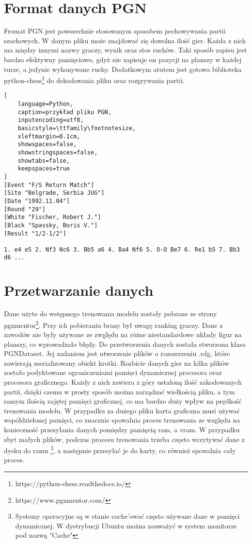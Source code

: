 \section*{Format danych PGN}
Fromat PGN jest powszechnie stosowanym sposobem pechowywania partii szachowych. W danym pliku może znajdować się dowolna ilość gier. Każda z nich ma między innymi nazwy graczy, wynik oraz stos ruchów. Taki sposób zapisu jest bardzo efektywny pamięciowo, gdyż nie zapisuje on pozycji na planszy w każdej turze, a jedynie wykonywane ruchy. Dodatkowym atutem jest gotowa biblioteka python-chess\footnote{https://python-chess.readthedocs.io/} do dekodowania pliku oraz rozgrywania partii.

\vspace{0.5cm}

\begin{lstlisting}[
    language=Python, 
    caption=przykład pliku PGN,
    inputencoding=utf8,
    basicstyle=\ttfamily\footnotesize,
    xleftmargin=0.1cm,
    showspaces=false,
    showstringspaces=false,
    showtabs=false,
    keepspaces=true
]
[Event "F/S Return Match"] 
[Site "Belgrade, Serbia JUG"] 
[Date "1992.11.04"] 
[Round "29"] 
[White "Fischer, Robert J."]
[Black "Spassky, Boris V."] 
[Result "1/2-1/2"] 

1. e4 e5 2. Nf3 Nc6 3. Bb5 a6 4. Ba4 Nf6 5. O-O Be7 6. Re1 b5 7. Bb3 d6 ...
\end{lstlisting}
\section*{Przetwarzanie danych}
Dane użyte do wstępnego trenowania modelu zostały pobrane ze strony pgnmentor\footnote{https://www.pgnmentor.com/}. Przy ich pobieraniu brany był uwagę ranking graczy. Dane z zawodów nie były używane ze zwględu na różne niestandardowe układy figur na planszy, co wprowadzało błędy. Do przetworzenia danych została stworzona klasa PGNDataset. Jej zadaniem jest utworzenie plików o rozszerzeniu .rdg, które zawierają zserializowany obiekt krotki. Rozbicie danych gier na kilka plików zostało podyktowane ograniczeniami pamięci dynamicznej procesora oraz procesora graficznego. Każdy z nich zawiera z góry ustaloną ilość zakodowanych partii, dzięki czemu w prosty sposób można zarządzać wielkością pliku, a tym samym ilością zajętej pamięci graficznej, co ma bardzo duży wpływ na prędkość trenowania modelu. W przypadku za dużego pliku karta graficzna musi używać współdzielonej pamięci, co znacznie spowalnia proces trenowania ze względu na konieczność przesyłania danych pomiędzy pamięcią ram, a vram. W przypadku zbyt małych plików, podczas procesu trenowania trzeba często wczytywać dane z dysku do ramu \footnote{Systemy operacyjne są w stanie cache'ować często używane dane w pamięci dynamicznej. W dystrybucji Ubuntu można zauważyć w system monitorze pod nazwą "Cache"}, a następnie przesyłać je do karty, co również spowalnia cały proces.

